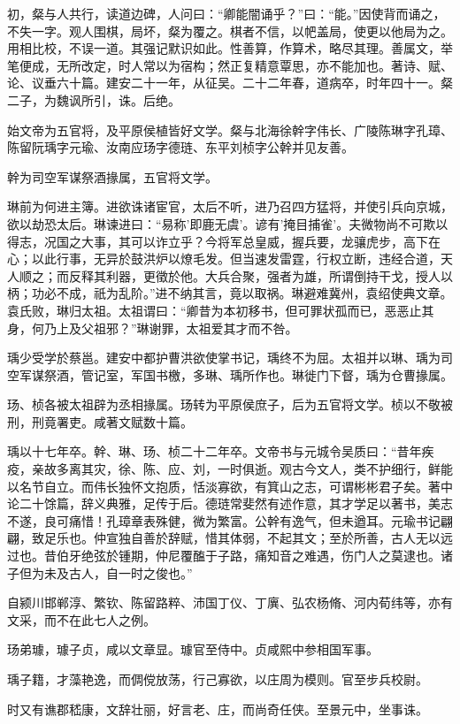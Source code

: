 \documentclass[12pt,UTF8]{ctexbook}
\begin{document}
初，粲与人共行，读道边碑，人问曰：“卿能闇诵乎？”曰：“能。”因使背而诵之，不失一字。观人围棋，局坏，粲为覆之。棋者不信，以帊盖局，使更以他局为之。用相比校，不误一道。其强记默识如此。性善算，作算术，略尽其理。善属文，举笔便成，无所改定，时人常以为宿构；然正复精意覃思，亦不能加也。著诗、赋、论、议垂六十篇。建安二十一年，从征吴。二十二年春，道病卒，时年四十一。粲二子，为魏讽所引，诛。后绝。

始文帝为五官将，及平原侯植皆好文学。粲与北海徐幹字伟长、广陵陈琳字孔璋、陈留阮瑀字元瑜、汝南应玚字德琏、东平刘桢字公幹并见友善。

幹为司空军谋祭酒掾属，五官将文学。

琳前为何进主簿。进欲诛诸宦官，太后不听，进乃召四方猛将，并使引兵向京城，欲以劫恐太后。琳谏进曰：“易称'即鹿无虞'。谚有'掩目捕雀'。夫微物尚不可欺以得志，况国之大事，其可以诈立乎？今将军总皇威，握兵要，龙骧虎步，高下在心；以此行事，无异於鼓洪炉以燎毛发。但当速发雷霆，行权立断，违经合道，天人顺之；而反释其利器，更徵於他。大兵合聚，强者为雄，所谓倒持干戈，授人以柄；功必不成，祇为乱阶。”进不纳其言，竟以取祸。琳避难冀州，袁绍使典文章。袁氏败，琳归太祖。太祖谓曰：“卿昔为本初移书，但可罪状孤而已，恶恶止其身，何乃上及父祖邪？”琳谢罪，太祖爱其才而不咎。

瑀少受学於蔡邕。建安中都护曹洪欲使掌书记，瑀终不为屈。太祖并以琳、瑀为司空军谋祭酒，管记室，军国书檄，多琳、瑀所作也。琳徙门下督，瑀为仓曹掾属。

玚、桢各被太祖辟为丞相掾属。玚转为平原侯庶子，后为五官将文学。桢以不敬被刑，刑竟署吏。咸著文赋数十篇。

瑀以十七年卒。幹、琳、玚、桢二十二年卒。文帝书与元城令吴质曰：“昔年疾疫，亲故多离其灾，徐、陈、应、刘，一时俱逝。观古今文人，类不护细行，鲜能以名节自立。而伟长独怀文抱质，恬淡寡欲，有箕山之志，可谓彬彬君子矣。著中论二十馀篇，辞义典雅，足传于后。德琏常斐然有述作意，其才学足以著书，美志不遂，良可痛惜！孔璋章表殊健，微为繁富。公幹有逸气，但未遒耳。元瑜书记翩翩，致足乐也。仲宣独自善於辞赋，惜其体弱，不起其文；至於所善，古人无以远过也。昔伯牙绝弦於锺期，仲尼覆醢于子路，痛知音之难遇，伤门人之莫逮也。诸子但为未及古人，自一时之俊也。”

自颍川邯郸淳、繁钦、陈留路粹、沛国丁仪、丁廙、弘农杨脩、河内荀纬等，亦有文采，而不在此七人之例。

玚弟璩，璩子贞，咸以文章显。璩官至侍中。贞咸熙中参相国军事。

瑀子籍，才藻艳逸，而倜傥放荡，行己寡欲，以庄周为模则。官至步兵校尉。

时又有谯郡嵇康，文辞壮丽，好言老、庄，而尚奇任侠。至景元中，坐事诛。
\end{document}
